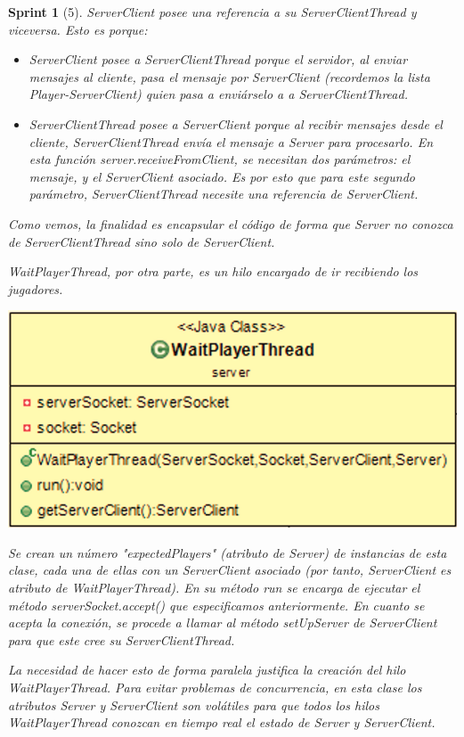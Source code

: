 \documentclass{article}
\theoremstyle{break}
\newtheorem*{sprint}{Sprint}
\begin{document}
\begin{sprint}[5]
ServerClient posee una referencia a su ServerClientThread y viceversa. Esto es porque:

\begin{itemize}
\item ServerClient posee a ServerClientThread porque el servidor, al enviar mensajes al cliente, pasa el mensaje por ServerClient (recordemos la lista Player-ServerClient) quien pasa a enviárselo a a ServerClientThread.
\item ServerClientThread posee a ServerClient porque al recibir mensajes desde el cliente, ServerClientThread envía el mensaje a Server para procesarlo. En esta función server.receiveFromClient, se necesitan dos parámetros: el mensaje, y el ServerClient asociado. Es por esto que para este segundo parámetro, ServerClientThread necesite una referencia de ServerClient.
\end{itemize}

Como vemos, la finalidad es encapsular el código de forma que Server no conozca de ServerClientThread sino solo de ServerClient.

WaitPlayerThread, por otra parte, es un hilo encargado de ir recibiendo los jugadores.

\begin{center}
\includegraphics[scale=0.3]{WaitPlayerThread-sprint5.png} 
\end{center}

Se crean un número "expectedPlayers" (atributo de Server) de instancias de esta clase, cada una de ellas con un ServerClient asociado (por tanto, ServerClient es atributo de WaitPlayerThread). En su método run se encarga de ejecutar el método serverSocket.accept() que especificamos anteriormente. En cuanto se acepta la conexión, se procede a llamar al método setUpServer de ServerClient para que este cree su ServerClientThread.

La necesidad de hacer esto de forma paralela justifica la creación del hilo WaitPlayerThread. Para evitar problemas de concurrencia, en esta clase los atributos Server y ServerClient son volátiles para que todos los hilos WaitPlayerThread conozcan en tiempo real el estado de Server y ServerClient.


\end{sprint}
\end{document}
